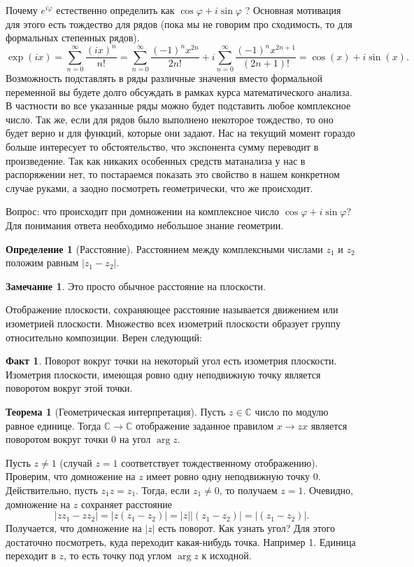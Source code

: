 \documentclass[10pt,a4paper,oneside]{book}
\theoremstyle{definition}
\newtheorem*{rem}{Замечание}
\newtheorem*{defn}{Определение}
\newtheorem*{fact}{Факт}
\newtheorem{thm}{Теорема}
\newcommand{\mb}[1]{\mathbb{#1}}
\def\thrm{\begin{thm}}
\def\ethrm{\end{thm}}
\def\dfn{\begin{defn}}
\def\edfn{\end{defn}}
\def\rm{\begin{rem}}
\def\erm{\end{rem}}
\begin{document}
Почему $e^{i\varphi}$ естественно определить как $\cos\varphi+i\sin \varphi$ ? Основная мотивация для этого есть тождество для рядов  (пока мы не говорим про сходимость, то для формальных степенных рядов).
$$\exp(ix) = \sum_{n=0}^{\infty} \frac{(ix)^n}{n!}=\sum_{n=0}^{\infty} \frac{(-1)^n x^{2n}}{2n!} + i\sum_{n=0}^{\infty} \frac{(-1)^n x^{2n+1}}{(2n+1)!}= \cos(x) + i\sin(x).$$
Возможность подставлять в ряды различные значения вместо формальной переменной вы будете долго обсуждать в рамках курса математического анализа. В частности во все указанные ряды можно будет подставить любое комплексное число. Так же, если для рядов было выполнено некоторое тождество, то оно будет верно и для функций, которые они задают.
Нас на текущий момент гораздо больше  интересует то обстоятельство, что экспонента сумму переводит в произведение. Так как никаких особенных средств матанализа у нас в распоряжении нет, то постараемся показать это свойство в нашем конкретном случае руками, а заодно посмотреть геометрически, что же происходит.


Вопрос: что происходит при домножении на комплексное число $\cos \varphi + i \sin \varphi$? Для понимания ответа необходимо небольшое знание геометрии.
\dfn[Расстояние] Расстоянием между комплексными числами $z_1$ и $z_2$ положим равным $|z_1-z_2 |$.
\edfn

\rm Это просто обычное расстояние на плоскости.
\erm

Отображение плоскости, сохраняющее расстояние называется движением или изометрией плоскости. Множество всех изометрий плоскости образует группу относительно композиции. Верен следующий:
\begin{fact} Поворот вокруг точки на некоторый угол есть изометрия плоскости. Изометрия плоскости, имеющая ровно
одну неподвижную точку является поворотом вокруг этой точки.
\end{fact}

\thrm[Геометрическая интерпретация] Пусть $z\in \mb C$ число по модулю равное единице. Тогда $\mb C \to \mb C$ отображение заданное правилом $ x\to zx$   является поворотом вокруг точки 0 на угол $\arg z$.
\ethrm
\proof Пусть $z\neq 1$ (случай $z=1$ соответствует тождественному отображению). Проверим, что домножение на $z$ имеет ровно одну неподвижную точку 0. Действительно, пусть $z_1z=z_1$. Тогда, если $z_1\neq 0$, то получаем $z=1$. Очевидно, домножение на $z$ сохраняет расстояние $$|zz_1-zz_2|=|z(z_1-z_2)|=|z||(z_1-z_2)|=|(z_1-z_2)|.$$
Получается, что домножение на $|z|$ есть поворот. Как узнать угол? Для этого достаточно посмотреть, куда переходит какая-нибудь точка. Например 1. Единица переходит в $z$, то есть точку под углом $\arg z$ к исходной.
\endproof
\end{document}
